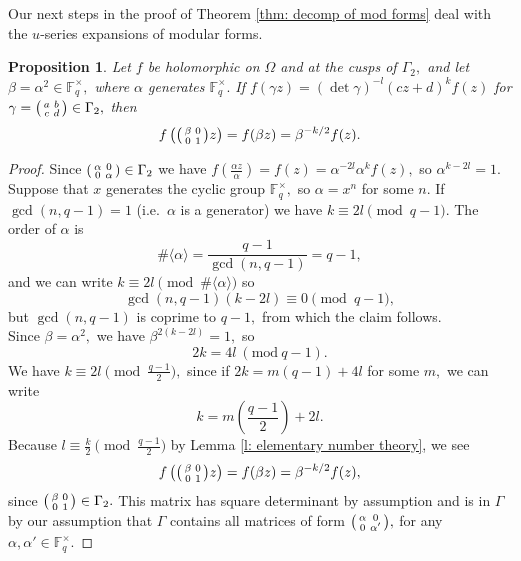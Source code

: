\documentclass[11pt]{amsart}
\newtheorem{proposition}[theorem]{Proposition}
\theoremstyle{definition}
\newenvironment{psmallmatrix}
{\left(\begin{smallmatrix}}
	{\end{smallmatrix}\right)}
\numberwithin{equation}{section}
\newcommand{\bbF}{\mathbb{F}}		%
\newcommand{\Mod}[1]{\ (\mathrm{mod}\ #1)}
\begin{document}
Our next steps in the proof of Theorem \ref{thm: decomp of mod forms} deal with the $u$-series expansions of modular forms. 
\begin{proposition}\label{p: generator trick}
Let $f$ be holomorphic on $\Omega$ and at the cusps of $\Gamma_2,$ and let $\beta=\alpha^2\in \bbF_q^{\times},$ where $\alpha$ generates $\bbF_q^{\times}.$ If $f(\gamma z)=(\det\gamma)^{-l}(cz+d)^kf(z)$ for $\displaystyle{\gamma=\begin{psmallmatrix}a&b\\c&d\end{psmallmatrix}\in \Gamma_2},$ then \[f\left(\begin{psmallmatrix}\beta&0\\0&1\end{psmallmatrix}z \right) = f(\beta z)=\beta^{-k/2}f(z).\]
\end{proposition}
\begin{proof}
Since $\displaystyle{\begin{psmallmatrix}\alpha&0\\0&\alpha\end{psmallmatrix}\in \Gamma_2}$ we have $\displaystyle{f\left(\frac{\alpha z}{\alpha}\right) = f(z)=\alpha^{-2l}\alpha^k f(z)},$ so 
$\alpha^{k-2l}=1.$\\

Suppose that $x$ generates the cyclic group $\bbF_q^{\times},$ so $\alpha = x^n$ for some $n.$
If $\gcd(n,q-1)=1$ (i.e.\ $\alpha$ is a generator) we have $k\equiv 2l\pmod{q-1}.$ The order of $\alpha$ is \[\#\langle\alpha\rangle=\frac{q-1}{\gcd(n,q-1)}=q-1, \] and we can write $k\equiv 2l\pmod{\#\langle \alpha\rangle}$ so 
\[\gcd(n,q-1)(k-2l)\equiv 0\pmod{q-1},\] but $\gcd(n,q-1)$ is coprime to $q-1,$ from which the claim follows.\\

Since $\beta=\alpha^2,$ we have $\beta^{2(k-2l)}=1,$ so \[2k=4l\Mod{q-1}.\] We have $k\equiv 2l\pmod{\frac{q-1}{2}},$ since if $2k=m(q-1)+4l$ for some $m,$ we can write 
\[k=m\left(\frac{q-1}{2}\right)+2l.\]
Because $\displaystyle{l\equiv \frac{k}{2}\pmod{\frac{q-1}{2}}}$ by Lemma \ref{l: elementary number theory}, we see  
\[f\left(\begin{psmallmatrix}\beta&0\\0&1\end{psmallmatrix}z\right) = f(\beta z) = \beta^{-k/2}f(z),\]
since $\begin{psmallmatrix}\beta&0\\0&1\end{psmallmatrix}\in \Gamma_2.$ This matrix has square determinant by assumption and is in $\Gamma$ by our assumption that $\Gamma$ contains all matrices of form $\displaystyle{\begin{psmallmatrix}\alpha&0\\0&\alpha'\end{psmallmatrix}},$ for any $\alpha,\alpha'\in \bbF_q^{\times}.$
\end{proof}
\end{document}
